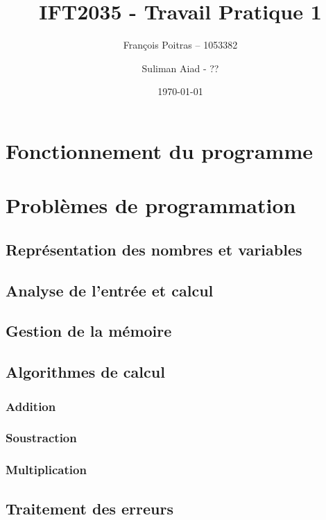 \documentclass[10pt]{article}
\title{IFT2035 - Travail Pratique 1}
\author{François Poitras -- 1053382\\
\and
Suliman Aiad - ??
}
\date{\today}
\begin{document}
\maketitle
\section{Fonctionnement du programme}
\section{Problèmes de programmation}
\subsection{Représentation des nombres et variables}
\subsection{Analyse de l'entrée et calcul}
\subsection{Gestion de la mémoire}
\subsection{Algorithmes de calcul}
\subsubsection{Addition}
\subsubsection{Soustraction}
\subsubsection{Multiplication}
\subsection{Traitement des erreurs}
\end{document}
